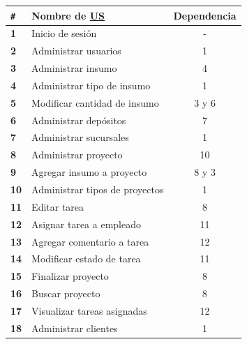 \documentclass[a4paper, 12pt,twoside]{report}  %
\numberwithin{equation}{subsection} %
\begin{document}
\begin{table}[h!]
	\centering
	\begin{tabular}{ |p{0.5cm}|p{9cm}|c|  }
		\hline
		\verb|#|& \textbf{Nombre de \hyperlink{US}{US}}& \textbf{Dependencia} \\
		\hline
		\textbf{1} & \cellcolor{marca_US_realizada_anterior}Inicio de sesión & - \\
		\hline
		\textbf{2} & \cellcolor{marca_US_realizada_anterior}Administrar usuarios & 1 \\
		\hline
		\textbf{3} & \cellcolor{marca_US_realizada_anterior}Administrar insumo & 4 \\
		\hline
		\textbf{4} & \cellcolor{marca_US_realizada_anterior}Administrar tipo de insumo & 1 \\
		\hline
		\textbf{5} & \cellcolor{marca_US_realizada_anterior}Modificar cantidad de insumo & 3 y 6 \\
		\hline
		\textbf{6} & \cellcolor{marca_US_realizada_anterior}Administrar depósitos & 7 \\
		\hline
		\textbf{7} & \cellcolor{marca_US_realizada_anterior}Administrar sucursales & 1 \\
		\hline
		\textbf{8} & \cellcolor{marca_US_realizada_anterior}Administrar proyecto & 10 \\
		\hline
		\textbf{9} & \cellcolor{marca_US_realizada}Agregar insumo a proyecto & 8 y 3 \\
		\hline
		\textbf{10} & \cellcolor{marca_US_realizada_anterior}Administrar tipos de proyectos & 1 \\
		\hline
		\textbf{11} & \cellcolor{marca_US_realizada}Editar tarea & 8 \\
		\hline
		\textbf{12} & \cellcolor{marca_US_realizada_anterior}Asignar tarea a empleado & 11\\
		\hline
		\textbf{13} & \cellcolor{marca_US_realizada}Agregar comentario a tarea & 12 \\
		\hline
		\textbf{14} & \cellcolor{marca_US_realizada}Modificar estado de tarea & 11 \\
		\hline
		\textbf{15} & \cellcolor{marca_US_realizada}Finalizar proyecto & 8 \\
		\hline
		\textbf{16} & \cellcolor{marca_US_realizada_anterior}Buscar proyecto & 8 \\
		\hline
		\textbf{17} & \cellcolor{marca_US_realizada_anterior}Visualizar tareas asignadas & 12 \\
		\hline
		\textbf{18} & \cellcolor{marca_US_realizada_anterior}Administrar clientes & 1 \\

\end{tabular}
\end{table}
\end{document}
